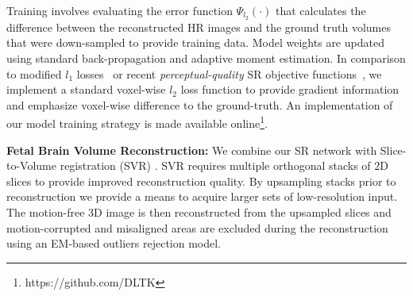 \documentclass[runningheads,a4paper]{llncs}
\begin{document}
Training involves evaluating the error function $\Psi_{l_2}(\cdot)$ that calculates the difference between the reconstructed HR images and the ground truth volumes that were down-sampled to provide training data. Model weights are updated using standard back-propagation and adaptive moment estimation. %
In comparison to modified $l_1$ losses~\cite{Oktay2016} or recent \emph{perceptual-quality} SR objective functions~\cite{Ledig2016}, we implement a standard voxel-wise $l_2$ loss function to provide gradient information and emphasize voxel-wise difference to the ground-truth. An implementation of our model training strategy is made available online\footnote{https://github.com/DLTK}.
\newline

\noindent \textbf{Fetal Brain Volume Reconstruction:} We combine our SR network with Slice-to-Volume registration (SVR) \cite{kainz2015fast}. SVR requires multiple orthogonal stacks of 2D slices to provide improved reconstruction quality. By upsampling stacks prior to reconstruction we provide a means to acquire larger sets of low-resolution input. %
The motion-free 3D image is then reconstructed from the upsampled slices and motion-corrupted and misaligned areas are excluded during the reconstruction using an EM-based outliers rejection model.%
 
\end{document}
